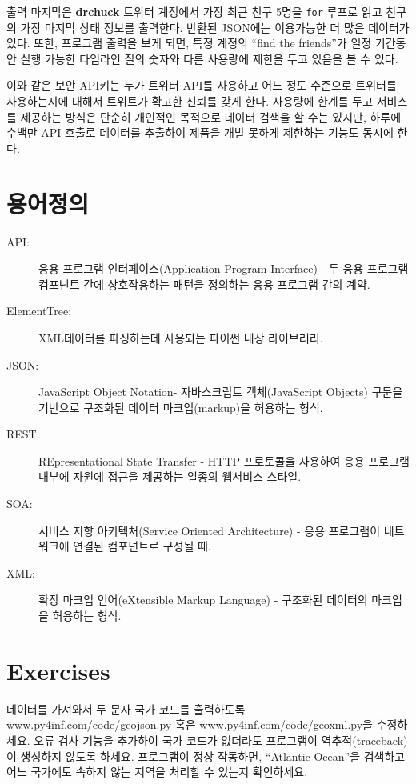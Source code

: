 출력 마지막은 {\bf drchuck} 트위터 계정에서 가장 최근 친구 5명을 {\tt for} 루프로 읽고 친구의 가장 마지막 상태 정보를 출력한다. 
반환된 JSON에는 이용가능한 더 많은 데이터가 있다.
또한, 프로그램 출력을 보게 되면, 특정 계정의 ``find the friends''가 일정 기간동안 실행 가능한 타임라인 질의 숫자와 다른 사용량에 제한을 두고 있음을 볼 수 있다.

이와 같은 보안 API키는 누가 트위터 API를 사용하고 어느 정도 수준으로 트위터를 사용하는지에 대해서 트위트가 확고한 신뢰를 갖게 한다. 
사용량에 한계를 두고 서비스를 제공하는 방식은 단순히 개인적인 목적으로 데이터 검색을 할 수는 있지만, 하루에 수백만 API 호출로 데이터를 추출하여 제품을 개발 못하게 제한하는 기능도 동시에 한다.

\section{용어정의}

\begin{description}

\item[API:] 응용 프로그램 인터페이스(Application Program Interface) - 
두 응용 프로그램 컴포넌트 간에 상호작용하는 패턴을 정의하는 응용 프로그램 간의 계약.

\item[ElementTree:] XML데이터를 파싱하는데 사용되는 파이썬 내장 라이브러리.

\item[JSON:] JavaScript Object Notation- 자바스크립트 객체(JavaScript Objects) 구문을 기반으로
구조화된 데이터 마크업(markup)을 허용하는 형식.

\item[REST:] REpresentational State Transfer -
HTTP 프로토콜을 사용하여 응용 프로그램 내부에 자원에 접근을 제공하는 일종의 웹서비스 스타일.

\item[SOA:] 서비스 지향 아키텍처(Service Oriented Architecture) - 
응용 프로그램이 네트워크에 연결된 컴포넌트로 구성될 때.

\item[XML:] 확장 마크업 언어(eXtensible Markup Language) - 
구조화된 데이터의 마크업을 허용하는 형식.

\end{description}

\section{Exercises}

\begin{ex}
데이터를 가져와서 두 문자 국가 코드를 출력하도록 \url{www.py4inf.com/code/geojson.py} 혹은
\url{www.py4inf.com/code/geoxml.py}을 수정하세요.
오류 검사 기능을 추가하여 국가 코드가 없더라도 프로그램이 역추적(traceback)이 생성하지 않도록 하세요.
프로그램이 정상 작동하면, ``Atlantic Ocean''을 검색하고 어느 국가에도 속하지 않는 지역을 처리할 수 있는지 확인하세요. 

\end{ex}

